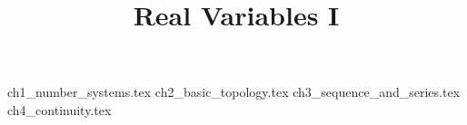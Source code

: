 \documentclass[]{report}
\title{Real Variables I}
\begin{document}
\maketitle
{ch1_number_systems.tex}
{ch2_basic_topology.tex}
{ch3_sequence_and_series.tex}
{ch4_continuity.tex}
\end{document}
